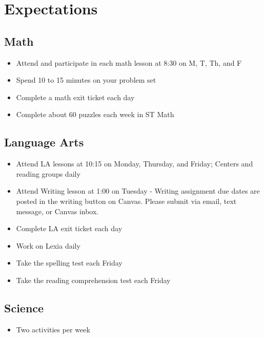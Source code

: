 \documentclass{article}
\begin{document}
\fontsize{16pt}{20pt}\selectfont

\newpage\section*{\centering\Huge{Expectations}}

\subsection*{\centering\LARGE{Math}}

\begin{itemize}
  \item Attend and participate in each math lesson at 8:30 on M, T, Th, and F
  \item Spend 10 to 15 minutes on your problem set
  \item Complete a math exit ticket each day
  \item Complete about 60 puzzles each week in ST Math
\end{itemize}

\subsection*{\centering\LARGE{Language Arts}}

\begin{itemize}
  \item Attend LA lessons at 10:15 on Monday, Thursday, and Friday; Centers and
    reading groups daily
  \item Attend Writing lesson at 1:00 on Tuesday - Writing assignment due dates
    are posted in the writing button on Canvas.  Please submit via email, text
    message, or Canvas inbox.
  \item Complete LA exit ticket each day
  \item Work on Lexia daily
  \item Take the spelling test each Friday
  \item Take the reading comprehension test each Friday
\end{itemize}

\subsection*{\centering\LARGE{Science}}

\begin{itemize}
  \item Two activities per week
\end{itemize}
\end{document}
